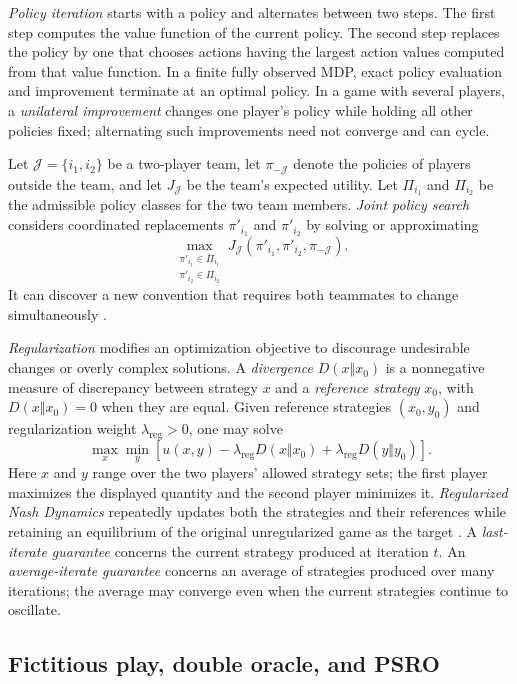 \emph{Policy iteration} starts with a policy and alternates between two steps. The first step computes the value function of the current policy. The second step replaces the policy by one that chooses actions having the largest action values computed from that value function. In a finite fully observed MDP, exact policy evaluation and improvement terminate at an optimal policy. In a game with several players, a \emph{unilateral improvement} changes one player's policy while holding all other policies fixed; alternating such improvements need not converge and can cycle.

Let $\mathcal{J}=\{i_1,i_2\}$ be a two-player team, let $\pi_{-\mathcal{J}}$ denote the policies of players outside the team, and let $J_{\mathcal{J}}$ be the team's expected utility. Let $\Pi_{i_1}$ and $\Pi_{i_2}$ be the admissible policy classes for the two team members. \emph{Joint policy search} considers coordinated replacements $\pi'_{i_1}$ and $\pi'_{i_2}$ by solving or approximating
\[
    \max_{\substack{\pi'_{i_1}\in\Pi_{i_1}\\
                     \pi'_{i_2}\in\Pi_{i_2}}}
    J_{\mathcal{J}}(\pi'_{i_1},\pi'_{i_2},\pi_{-\mathcal{J}}).
\]
It can discover a new convention that requires both teammates to change simultaneously \cite{tian2020joint}.

\emph{Regularization} modifies an optimization objective to discourage undesirable changes or overly complex solutions. A \emph{divergence} $D(x\Vert x_0)$ is a nonnegative measure of discrepancy between strategy $x$ and a \emph{reference strategy} $x_0$, with $D(x\Vert x_0)=0$ when they are equal. Given reference strategies $(x_0,y_0)$ and regularization weight $\lambda_{\mathrm{reg}}>0$, one may solve
\[
    \max_x\min_y
    \left[
      u(x,y)
      -
      \lambda_{\mathrm{reg}}D(x\Vert x_0)
      +
      \lambda_{\mathrm{reg}}D(y\Vert y_0)
    \right].
\]
Here $x$ and $y$ range over the two players' allowed strategy sets; the first player maximizes the displayed quantity and the second player minimizes it.
\emph{Regularized Nash Dynamics} repeatedly updates both the strategies and their references while retaining an equilibrium of the original unregularized game as the target \cite{perolat2022deepnash}. A \emph{last-iterate guarantee} concerns the current strategy produced at iteration $t$. An \emph{average-iterate guarantee} concerns an average of strategies produced over many iterations; the average may converge even when the current strategies continue to oscillate.


\subsection{Fictitious play, double oracle, and PSRO}
\label{app:psro}

